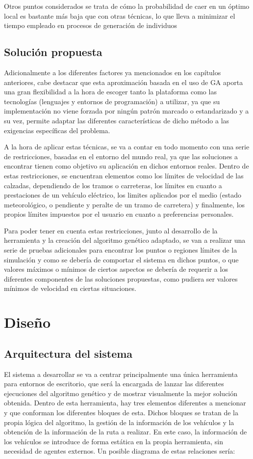 \documentclass[11pt,spanish,listoffigures,listoftables]{tfgetsinf}
\begin{document}
Otros puntos considerados se trata de cómo la probabilidad de caer en un óptimo local es bastante más baja que con otras técnicas, lo que lleva a minimizar el tiempo empleado en procesos de generación de individuos

\section{Solución propuesta}
Adicionalmente a los diferentes factores ya mencionados en los capítulos anteriores, cabe destacar que esta aproximación basada en el uso de GA aporta una gran flexibilidad a la hora de escoger tanto la plataforma como las tecnologías (lenguajes y entornos de programación) a utilizar, ya que su implementación no viene forzada por ningún patrón marcado o estandarizado y a su vez, permite adaptar las diferentes características de dicho método a las exigencias específicas del problema.

A la hora de aplicar estas técnicas, se va a contar en todo momento con una serie de restricciones, basadas en el entorno del mundo real, ya que las soluciones a encontrar tienen como objetivo su aplicación en dichos entornos reales. Dentro de estas restricciones, se encuentran elementos como los límites de velocidad de las calzadas, dependiendo de los tramos o carreteras, los límites en cuanto a prestaciones de un vehículo eléctrico, los limites aplicados por el medio (estado meteorológico, o pendiente y peralte de un tramo de carretera) y finalmente, los propios límites impuestos por el usuario en cuanto a preferencias personales.

Para poder tener en cuenta estas restricciones, junto al desarrollo de la herramienta y la creación del algoritmo genético adaptado, se van a realizar una serie de pruebas adicionales para encontrar los puntos o regiones límites de la simulación y como se debería de comportar el sistema en dichos puntos, o que valores máximos o mínimos de ciertos aspectos se debería de requerir a los diferentes componentes de las soluciones propuestas, como pudiera ser valores mínimos de velocidad en ciertas situaciones.

\chapter{Diseño}
\section{Arquitectura del sistema}
El sistema a desarrollar se va a centrar principalmente una única herramienta para entornos de escritorio, que será la encargada de lanzar las diferentes ejecuciones del algoritmo genético y de mostrar visualmente la mejor solución obtenida. Dentro de esta herramienta, hay tres elementos diferentes a mencionar y que conforman los diferentes bloques de esta. Dichos bloques se tratan de la propia lógica del algoritmo, la gestión de la información de los vehículos y la obtención de la información de la ruta a realizar. En este caso, la información de los vehículos se introduce de forma estática en la propia herramienta, sin necesidad de agentes externos. Un posible diagrama de estas relaciones sería:
\end{document}
